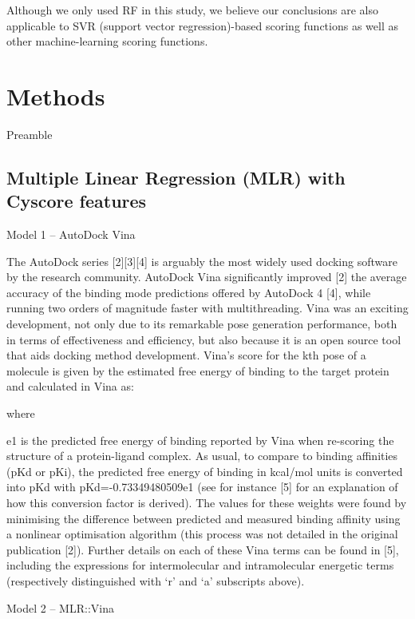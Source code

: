 \documentclass[twocolumn]{bmcart}
\begin{document}
Although we only used RF in this study, we believe our conclusions are also applicable to SVR (support vector regression)-based scoring functions \cite{1295,963} as well as other machine-learning scoring functions.

\section*{Methods}

Preamble

\subsection*{Multiple Linear Regression (MLR) with Cyscore features}

Model 1 – AutoDock Vina

The AutoDock series [2][3][4] is arguably the most widely used docking software by the research community. AutoDock Vina significantly improved [2] the average accuracy of the binding mode predictions offered by AutoDock 4 [4], while running two orders of magnitude faster with multithreading. Vina was an exciting development, not only due to its remarkable pose generation performance, both in terms of effectiveness and efficiency, but also because it is an open source tool that aids docking method development. 
Vina’s score for the kth pose of a molecule is given by the estimated free energy of binding to the target protein and calculated in Vina as:

	                                               

where
 
 
 

e1 is the predicted free energy of binding reported by Vina when re-scoring the structure of a protein-ligand complex. As usual, to compare to binding affinities (pKd or pKi), the predicted free energy of binding in kcal/mol units is converted into pKd with pKd=-0.73349480509e1 (see for instance [5] for an explanation of how this conversion factor is derived). The values for these weights were found by minimising the difference between predicted and measured binding affinity using a nonlinear optimisation algorithm (this process was not detailed in the original publication [2]).  Further details on each of these Vina terms can be found in [5], including the expressions for intermolecular and intramolecular energetic terms (respectively distinguished with ‘r’ and ‘a’ subscripts above). 

Model 2 – MLR::Vina
\end{document}

